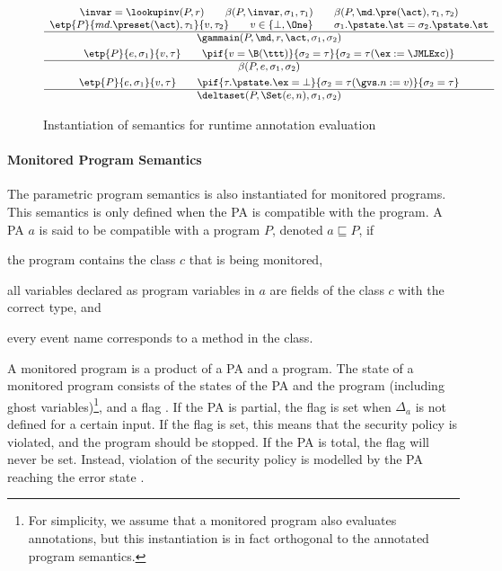 \begin{figure}[t]
\[{\small
\begin{array}[t]{c}
\invar = \lookupinv(P, r) \qquad
\beta(P, \invar, \sigma_1, \tau_1) \qquad
\beta(P, \md.\pre(\act), \tau_1, \tau_2) \\
\etp{P}{md.\preset(\act), \tau_1}{v,\tau_2} \qquad v\in\{\bot,\One\} \qquad
\sigma_1.\pstate.\st = \sigma_2.\pstate.\st\\
\hline
\gammain(P, \md, r, \act, \sigma_1, \sigma_2)
\smallskip\\


\etp{P}{e, \sigma_1}{v, \tau} \qquad
\pif{v = \B(\ttt)}{\sigma_2 = \tau}{\sigma_2 = \tau (\ex := \JMLExc)}\\
\hline
\beta(P, e, \sigma_1, \sigma_2)

\smallskip\\

\etp{P}{e, \sigma_1}{v, \tau} \qquad
\pif{\tau.\pstate.\ex = \bot}{\sigma_2 = \tau (\gvs.n := v)}{\sigma_2 = \tau}\\
\hline
\deltaset(P, \Set(e, n), \sigma_1, \sigma_2)
\end{array}}
\]
\caption{Instantiation of semantics for runtime annotation evaluation}
\label{FigAnnotatedSem}
\end{figure}


\paragraph{Monitored Program Semantics}
The parametric program semantics is also instantiated for monitored
programs. This semantics is only defined when the PA is compatible
with the program. A PA \(a\) is said to be compatible with a program
\(P\), denoted \(a \sqsubseteq P\), if
\begin{inparaenum}
\item the program contains the class \(c\) that is being monitored,
\item all variables declared as program variables in
\(a\) are fields of the class \(c\) with the correct type, and
\item every event name corresponds to a method in the class.
\end{inparaenum}
A monitored program is a product of a PA and a program. The state of a
monitored program consists of the states of the PA and the program
(including ghost variables)\footnote{For simplicity, we assume that a
monitored program also evaluates annotations, but this instantiation
is in fact orthogonal to the annotated program semantics.}, and a flag
\stuck. If the PA is partial, the flag
\stuck is set when \(\Delta_a\) is not defined for a
certain input. If the flag is set, this means that the security policy
is violated, and the program should be stopped. If the PA is total,
the \stuck flag will never be set. Instead, violation of the security
policy is modelled by the PA reaching the error state \halted.

